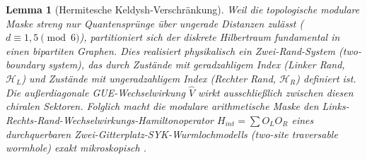 \documentclass[aps,prl,preprint,superscriptaddress,floatfix]{revtex4-2}
\newtheorem{lemma}[theorem]{Lemma}
\newcommand{\Hilb}{\mathcal{H}}
\begin{document}
\begin{lemma}[Hermitesche Keldysh-Verschränkung]
\label{lemma:keldysh_hermitian_entanglement}
Weil die topologische modulare Maske streng nur Quantensprünge über ungerade Distanzen zulässt ($d \equiv 1, 5 \pmod 6$), partitioniert sich der diskrete Hilbertraum fundamental in einen bipartiten Graphen. Dies realisiert physikalisch ein Zwei-Rand-System (\textit{two-boundary system}), das durch Zustände mit geradzahligem Index (Linker Rand, $\Hilb_L$) und Zustände mit ungeradzahligem Index (Rechter Rand, $\Hilb_R$) definiert ist. Die außerdiagonale GUE-Wechselwirkung $\hat{V}$ wirkt \emph{ausschließlich} zwischen diesen chiralen Sektoren. Folglich macht die modulare arithmetische Maske den Links-Rechts-Rand-Wechselwirkungs-Hamiltonoperator $H_{int} = \sum O_L O_R$ eines durchquerbaren Zwei-Gitterplatz-SYK-Wurmlochmodells (\textit{two-site traversable wormhole}) exakt mikroskopisch \cite{Zheng2024}.
\end{lemma}
\end{document}
